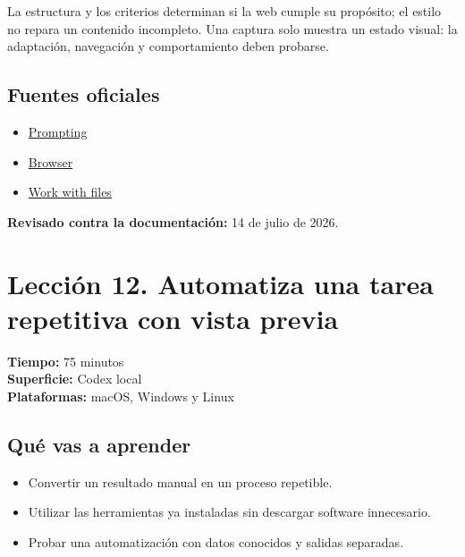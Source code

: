 \documentclass[10pt,a4paper,openany]{book}
\providecommand{\tightlist}{\setlength{\itemsep}{0.18em}\setlength{\parskip}{0pt}}
\begin{document}
La estructura y los criterios determinan si la web cumple su propósito;
el estilo no repara un contenido incompleto. Una captura solo muestra un
estado visual: la adaptación, navegación y comportamiento deben
probarse.

\subsection{Fuentes oficiales}\label{fuentes-oficiales-10}

\begin{itemize}
\tightlist
\item
  \href{https://learn.chatgpt.com/docs/prompting}{Prompting}
\item
  \href{https://learn.chatgpt.com/docs/browser}{Browser}
\item
  \href{https://learn.chatgpt.com/docs/artifacts-viewer}{Work with
  files}
\end{itemize}

\textbf{Revisado contra la documentación:} 14 de julio de 2026.

\clearpage

\section{Lección 12. Automatiza una tarea repetitiva con vista
previa}\label{lecciuxf3n-12.-automatiza-una-tarea-repetitiva-con-vista-previa}

\begin{metabox}

\textbf{Tiempo:} 75 minutos\\
\textbf{Superficie:} Codex local\\
\textbf{Plataformas:} macOS, Windows y Linux

\end{metabox}

\subsection{Qué vas a aprender}\label{quuxe9-vas-a-aprender-11}

\begin{itemize}
\tightlist
\item
  Convertir un resultado manual en un proceso repetible.
\item
  Utilizar las herramientas ya instaladas sin descargar software
  innecesario.
\item
  Probar una automatización con datos conocidos y salidas separadas.
\end{itemize}
\end{document}
